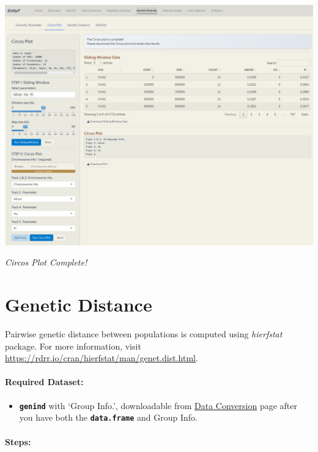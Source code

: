 \documentclass[
]{book}
\providecommand{\tightlist}{%
  \setlength{\itemsep}{0pt}\setlength{\parskip}{0pt}}
\begin{document}
\includegraphics{images/clipboard-3157688358.png}

\emph{Circos Plot Complete!}

\section{Genetic Distance}\label{genetic-distance}

Pairwise genetic distance between populations is computed using \emph{hierfstat} package. For more information, visit \hyperref[0]{https://rdrr.io/cran/hierfstat/man/genet.dist.html}.

\paragraph*{Required Dataset:}\label{required-dataset-6}

\begin{itemize}
\tightlist
\item
  {\textbf{\texttt{genind}}} with `Group Info.', downloadable from \ul{Data Conversion} page after you have both the {\textbf{\texttt{data.frame}}} and Group Info.
\end{itemize}

\paragraph*{\texorpdfstring{\textbf{Steps:}}{Steps:}}\label{steps-6}
\end{document}
